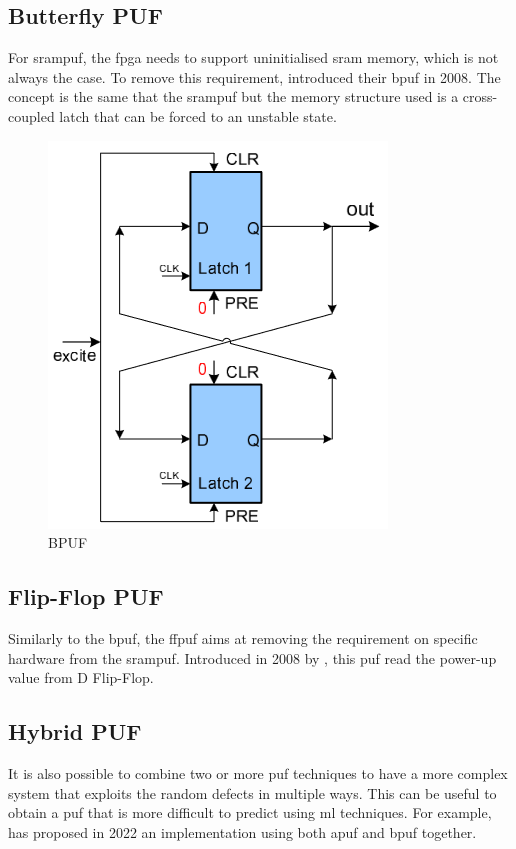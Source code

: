 \subsection{Butterfly PUF}

For \acrshort{srampuf}, the \acrshort{fpga} needs to support uninitialised \acrshort{sram} memory, which is not always the case. To remove this requirement, \cite{kumar_extended_2008} introduced their \acrfull{bpuf} in 2008. The concept is the same that the \acrshort{srampuf} but the memory structure used is a cross-coupled latch that can be forced to an unstable state. 


\begin{figure}[H]
    \centering
    \includegraphics[width=0.45\linewidth]{images/BPUF.png}
    \caption{BPUF \cite{kumar_extended_2008}}
    \label{fig:BPUF}
\end{figure}


\subsection{Flip-Flop PUF}

Similarly to the \acrshort{bpuf}, the \acrfull{ffpuf} aims at removing the requirement on specific hardware from the \acrshort{srampuf}. Introduced in 2008 by \cite{maes_intrinsic_2008}, this \acrshort{puf} read the power-up value from D Flip-Flop.

\newpage
\subsection{Hybrid PUF}

It is also possible to combine two or more \acrshort{puf} techniques to have a more complex system that exploits the random defects in multiple ways. This can be useful to obtain a \acrshort{puf} that is more difficult to predict using \acrfull{ml} techniques. For example, \cite{devika_fpga_2022} has proposed in 2022 an implementation using both \acrshort{apuf} and \acrshort{bpuf} together.

